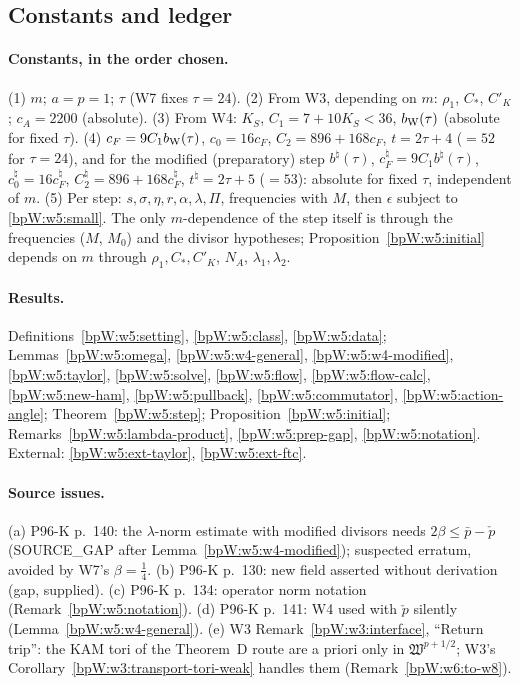 \subsection{Constants and ledger}\label{bpW:w5:ledger}

\paragraph{Constants, in the order chosen.} (1) $m$; $a=p=1$; $\tau$ (W7 fixes $\tau=24$). (2) From W3, depending on
$m$: $\rho_1$, $C_*$, $C'_K$; $c_A=2200$ (absolute). (3) From W4: $K_S$, $C_1=7+10K_S<36$, $b_{\rm W}(\tau)$ (absolute for
fixed $\tau$). (4) $c_F=9C_1b_{\rm W}(\tau)$, $c_0=16c_F$, $C_2=896+168c_F$, $t=2\tau+4$ ($=52$ for $\tau=24$), and for the modified
(preparatory) step $b^\natural(\tau)$, $c^\natural_F=9C_1b^\natural(\tau)$, $c^\natural_0=16c^\natural_F$, $C^\natural_2=896+168c^\natural_F$,
$t^\natural=2\tau+5$ ($=53$): absolute for fixed $\tau$, independent of $m$. (5) Per step: $s,\sigma,\eta,r,\alpha,\lambda,\Pi$, frequencies with $M$,
then $\epsilon$ subject to \eqref{bpW:w5:small}. The only $m$-dependence of the step itself is through the frequencies
($M$, $M_0$) and the divisor hypotheses; Proposition~\ref{bpW:w5:initial} depends on $m$ through $\rho_1,C_*,C'_K$,
$N_A$, $\lambda_1,\lambda_2$.

\paragraph{Results.} Definitions~\ref{bpW:w5:setting}, \ref{bpW:w5:class}, \ref{bpW:w5:data}; Lemmas~\ref{bpW:w5:omega},
\ref{bpW:w5:w4-general}, \ref{bpW:w5:w4-modified}, \ref{bpW:w5:taylor}, \ref{bpW:w5:solve}, \ref{bpW:w5:flow},
\ref{bpW:w5:flow-calc}, \ref{bpW:w5:new-ham}, \ref{bpW:w5:pullback}, \ref{bpW:w5:commutator}, \ref{bpW:w5:action-angle};
Theorem~\ref{bpW:w5:step}; Proposition~\ref{bpW:w5:initial}; Remarks~\ref{bpW:w5:lambda-product}, \ref{bpW:w5:prep-gap},
\ref{bpW:w5:notation}. External: \ref{bpW:w5:ext-taylor}, \ref{bpW:w5:ext-ftc}.

\paragraph{Source issues.} (a) P96-K p.~140: the $\lambda$-norm estimate with modified divisors needs $2\beta\le\bar p-\check p$
(\textsf{SOURCE\_GAP} after Lemma~\ref{bpW:w5:w4-modified}); suspected erratum, avoided by W7's $\beta=\frac14$. (b) P96-K p.~130: new field asserted without
derivation (gap, supplied). (c) P96-K p.~134: operator norm notation (Remark~\ref{bpW:w5:notation}). (d) P96-K p.~141: W4 used
with $\check p$ silently (Lemma~\ref{bpW:w5:w4-general}). (e) W3 Remark~\ref{bpW:w3:interface}, ``Return trip'': the KAM tori of
the Theorem~D route are a priori only in $\mathfrak W^{p+1/2}$; W3's Corollary~\ref{bpW:w3:transport-tori-weak} handles
them (Remark~\ref{bpW:w6:to-w8}).
